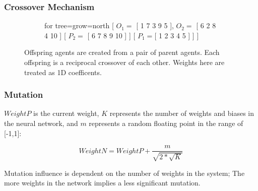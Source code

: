 \documentclass[aspectratio=169]{beamer}
\begin{document}

	\begin{frame}
		\frametitle{Crossover Mechanism}

		\begin{figure}
			\begin{figure}
				\LARGE
			\begin{forest}
				for tree={grow=north}
				[	{
					$O_{1} =$ [ 
							{\color{red}1}
							{\color{blue}7}
							{\color{red}3}
							{\color{blue}9}
							{\color{red}5} 
						], 
						$O_{2} =$	[ 
							{\color{blue}6}
							{\color{red}2}
							{\color{blue}8}
							{\color{red}4}
							{\color{blue}10} 
						]
					}
					[
						{
							$P_{2} =$ [
								{\color{blue}6}
								{\color{blue}7}
								{\color{blue}8}
								{\color{blue}9}
								{\color{blue}10}
							]
						}
					]
					[
						{
							$P_{1} =$[
								{\color{red}1}
								{\color{red}2}
								{\color{red}3}
								{\color{red}4}
								{\color{red}5}
							]
						}
					] 
				]
			\end{forest}
			\vspace{10mm}
		\end{figure}
			Offspring agents are created from a pair of parent agents.
			Each offspring is a reciprocal crossover of each other.
			Weights here are treated as 1D coefficents.
		\end{figure}
				
	\end{frame}

	\begin{frame}
		\frametitle{Mutation}
		$WeightP$ is the current weight, $K$ represents the number of weights and biases in the neural network, and $m$ represents a random floating point in the range of [-1,1]:

			$$ WeightN = WeightP + \frac{m}{\sqrt{2 * \sqrt{K} }}$$

		Mutation influence is dependent on the number of weights in the system; The more weights in the network implies a less significant mutation.
	\end{frame}
\end{document}
